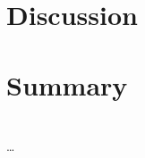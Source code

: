

\section{Discussion}
\label{sec:discussion}


\section{Summary}
\label{sec:summary}


\appendix*

\section{}
\label{sec:}
\subsection{}
\dots

